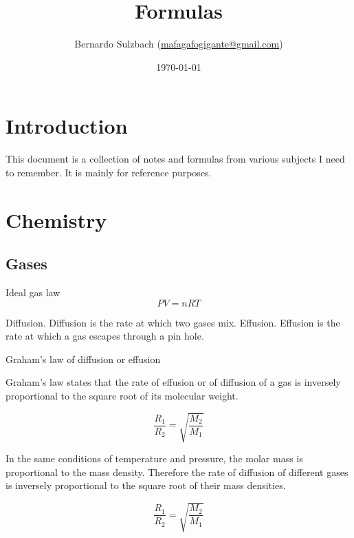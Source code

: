 \documentclass[oneside]{book} %
\title{Formulas}
\author{Bernardo Sulzbach
(\href{mailto:mafagafogigante@gmail.com}{mafagafogigante@gmail.com})}
\date{\today}
\theoremstyle{plain}
\begin{document}
\hypersetup{pageanchor=false} %
\begin{titlepage}
\maketitle
\end{titlepage}
\hypersetup{pageanchor=true}


\tableofcontents


\part{Introduction}
This document is a collection of notes and formulas from various subjects I
need to remember. It is mainly for reference purposes.


\part{Chemistry}


\chapter{Gases}

Ideal gas law
\[PV = nRT\]

Diffusion. Diffusion is the rate at which two gases mix.
Effusion. Effusion is the rate at which a gas escapes through a pin hole.

Graham's law of diffusion or effusion

Graham's law states that the rate of effusion or of diffusion of a gas is
inversely proportional to the square root of its molecular weight.

\[\frac{R_1}{R_2} = \sqrt{\frac{M_2}{M_1}}\]

In the same conditions of temperature and pressure, the molar mass is
proportional to the mass density. Therefore the rate of diffusion of different
gases is inversely proportional to the square root of their mass densities.

\[\frac{R_1}{R_2} = \sqrt{\frac{M_2}{M_1}}\]

\end{document}
